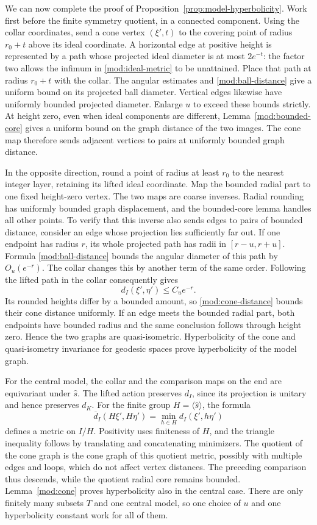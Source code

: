 \documentclass[11pt,reqno]{amsart}
\numberwithin{equation}{section}
\theoremstyle{definition}
\theoremstyle{remark}
\begin{document}
We can now complete the proof of
Proposition~\ref{prop:model-hyperbolicity}.  Work first before the
finite symmetry quotient, in a connected component.  Using the
collar coordinates, send a cone vertex $(\xi',t)$ to the covering
point of radius $r_0+t$ above its ideal coordinate.  A horizontal
edge at positive height is represented by a path whose projected
ideal diameter is at most $2e^{-t}$: the factor two allows the
infimum in \eqref{mod:ideal-metric} to be unattained.  Place that
path at radius $r_0+t$ with the collar.  The angular estimates and
\eqref{mod:ball-distance} give a uniform bound on its projected
ball diameter.  Vertical edges likewise have uniformly bounded
projected diameter.  Enlarge $u$ to exceed these bounds strictly.
At height zero, even when ideal components are different,
Lemma~\ref{mod:bounded-core} gives a uniform bound on the graph
distance of the two images.  The cone map therefore sends adjacent
vertices to pairs at uniformly bounded graph distance.

In the opposite direction, round a point of radius at least $r_0$
to the nearest integer layer, retaining its lifted ideal coordinate.
Map the bounded radial part to one fixed height-zero vertex.
The two maps are coarse inverses.  Radial rounding has uniformly
bounded graph displacement, and the bounded-core lemma handles
all other points.  To verify that this inverse also sends edges
to pairs of bounded distance, consider an edge whose projection
lies sufficiently far out.  If one endpoint has radius $r$, its
whole projected path has radii in $[r-u,r+u]$.  Formula
\eqref{mod:ball-distance} bounds the angular diameter of this path
by $O_u(e^{-r})$.  The collar changes this by another term of the
same order.  Following the lifted path in the collar consequently
gives
\[
 d_I(\xi',\eta')\le C_u e^{-r}.
\]
Its rounded heights differ by a bounded amount, so
\eqref{mod:cone-distance} bounds their cone distance uniformly.
If an edge meets the bounded radial part, both endpoints have
bounded radius and the same conclusion follows through height
zero.  Hence the two graphs are quasi-isometric.  Hyperbolicity
of the cone and quasi-isometry invariance for geodesic spaces
\cite[Chapter~III.H]{BridsonHaefliger} prove hyperbolicity of the
model graph.

For the central model, the collar and the comparison maps on the
end are equivariant under $\widehat s$.  The lifted action preserves
$d_I$, since its projection is unitary and hence preserves $d_K$.
For the finite group $H=\langle\widehat s\rangle$, the formula
\[
 \overline d_I(H\xi',H\eta')
   =\min_{h\in H}d_I(\xi',h\eta')
\]
defines a metric on $I/H$.  Positivity uses finiteness of $H$, and
the triangle inequality follows by translating and concatenating
minimizers.  The quotient of the cone graph is the cone graph of this quotient
metric, possibly with multiple edges and loops, which do not affect
vertex distances.
The preceding comparison thus descends, while the quotient radial
core remains bounded.  Lemma~\ref{mod:cone} proves hyperbolicity
also in the central case.  There are only finitely many subsets
$T$ and one central model, so one choice of $u$ and one
hyperbolicity constant work for all of them.
\end{document}
